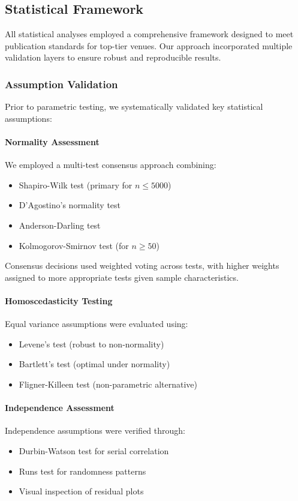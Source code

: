 \documentclass[conference]{IEEEtran}
\begin{document}
\subsection{Statistical Framework}
\label{subsec:statistical_framework}

All statistical analyses employed a comprehensive framework designed to meet publication standards for top-tier venues. Our approach incorporated multiple validation layers to ensure robust and reproducible results.

\subsubsection{Assumption Validation}
Prior to parametric testing, we systematically validated key statistical assumptions:

\paragraph{Normality Assessment}
We employed a multi-test consensus approach combining:
\begin{itemize}
    \item Shapiro-Wilk test (primary for $n \leq 5000$)
    \item D'Agostino's normality test
    \item Anderson-Darling test
    \item Kolmogorov-Smirnov test (for $n \geq 50$)
\end{itemize}

Consensus decisions used weighted voting across tests, with higher weights assigned to more appropriate tests given sample characteristics.

\paragraph{Homoscedasticity Testing}
Equal variance assumptions were evaluated using:
\begin{itemize}
    \item Levene's test (robust to non-normality)
    \item Bartlett's test (optimal under normality)
    \item Fligner-Killeen test (non-parametric alternative)
\end{itemize}

\paragraph{Independence Assessment}
Independence assumptions were verified through:
\begin{itemize}
    \item Durbin-Watson test for serial correlation
    \item Runs test for randomness patterns
    \item Visual inspection of residual plots
\end{itemize}
\end{document}
